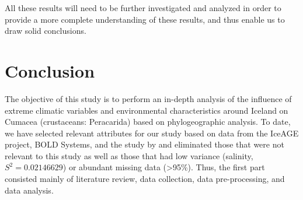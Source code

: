 All these results will need to be further investigated and analyzed in order to provide a more complete understanding of these results, and thus enable us to draw solid conclusions.

\section{Conclusion}\label{conclusion}

The objective of this study is to perform an in-depth analysis of the influence of extreme climatic variables and environmental characteristics around Iceland on Cumacea (crustaceans: Peracarida) based on phylogeographic analysis. To date, we have selected relevant attributes for our study based on data from the IceAGE project, BOLD Systems, and the study by \citep{uhlir_adding_2021} and eliminated those that were not relevant to this study as well as those that had low variance (salinity, \( S^2 = 0.02146629 \)) or abundant missing data (>95\%). Thus, the first part consisted mainly of literature review, data collection, data pre-processing, and data analysis.
